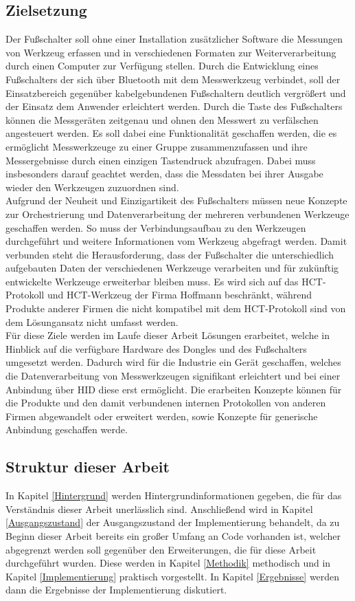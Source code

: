 \subsection{Zielsetzung}
Der Fußschalter soll ohne einer Installation zusätzlicher Software die Messungen von Werkzeug erfassen und in verschiedenen Formaten zur Weiterverarbeitung durch einen Computer zur Verfügung stellen. Durch die Entwicklung eines Fußschalters der sich über Bluetooth mit dem Messwerkzeug verbindet, soll der Einsatzbereich gegenüber kabelgebundenen Fußschaltern deutlich vergrößert und der Einsatz dem Anwender erleichtert werden. Durch die Taste des Fußschalters können die Messgeräten zeitgenau und ohnen den Messwert zu verfälschen angesteuert werden. Es soll dabei eine Funktionalität geschaffen werden, die es ermöglicht Messwerkzeuge zu einer Gruppe zusammenzufassen und ihre Messergebnisse durch einen einzigen Tastendruck abzufragen. Dabei muss insbesonders darauf geachtet werden, dass die Messdaten bei ihrer Ausgabe wieder den Werkzeugen zuzuordnen sind.\\
Aufgrund der Neuheit und Einzigartikeit des Fußschalters müssen neue Konzepte zur Orchestrierung und Datenverarbeitung der mehreren verbundenen Werkzeuge geschaffen werden. So muss der Verbindungsaufbau zu den Werkzeugen durchgeführt und weitere Informationen vom Werkzeug abgefragt werden. Damit verbunden steht die Herausforderung, dass der Fußschalter die unterschiedlich aufgebauten Daten der verschiedenen Werkzeuge verarbeiten und für zukünftig entwickelte Werkzeuge erweiterbar bleiben muss. Es wird sich auf das \ac{HCT}-Protokoll und \ac{HCT}-Werkzeug der Firma Hoffmann beschränkt, während Produkte anderer Firmen die nicht kompatibel mit dem \ac{HCT}-Protokoll sind von dem Lösungansatz nicht umfasst werden.\\
Für diese Ziele werden im Laufe dieser Arbeit Lösungen erarbeitet, welche in Hinblick auf die verfügbare Hardware des Dongles und des Fußschalters umgesetzt werden. Dadurch wird für die Industrie ein Gerät geschaffen, welches die Datenverarbeitung von Messwerkzeugen signifikant erleichtert und bei einer Anbindung über \ac{HID} diese erst ermöglicht. Die erarbeiten Konzepte können für die Produkte und den damit verbundenen internen Protokollen von anderen Firmen abgewandelt oder erweitert werden, sowie Konzepte für generische Anbindung geschaffen werde.

\subsection{Struktur dieser Arbeit}
In Kapitel \ref{Hintergrund} werden Hintergrundinformationen gegeben, die für das Verständnis dieser Arbeit unerlässlich sind. Anschließend wird in Kapitel \ref{Ausgangszustand} der Ausgangszustand der Implementierung behandelt, da zu Beginn dieser Arbeit bereits ein großer Umfang an Code vorhanden ist, welcher abgegrenzt werden soll gegenüber den Erweiterungen, die für diese Arbeit durchgeführt wurden. Diese werden in Kapitel \ref{Methodik} methodisch und in Kapitel \ref{Implementierung} praktisch vorgestellt. In Kapitel \ref{Ergebnisse} werden dann die Ergebnisse der Implementierung diskutiert.